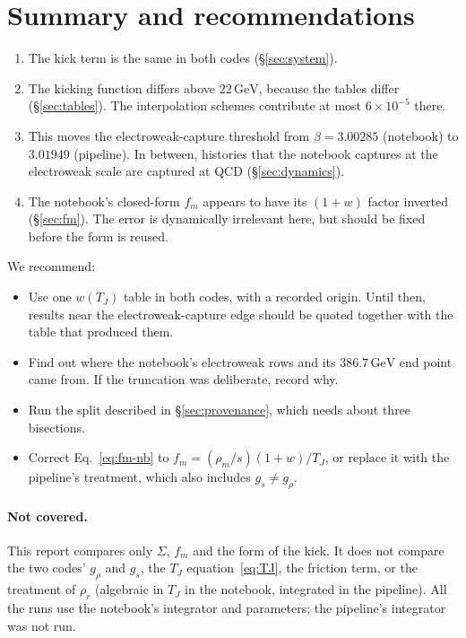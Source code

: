 \documentclass[11pt,a4paper]{article}
\newcommand{\TJ}{T_{J}}
\newcommand{\GeV}{\,\mathrm{GeV}}
\begin{document}
\section{Summary and recommendations}

\begin{enumerate}
\item The kick term is the same in both codes (\S\ref{sec:system}).
\item The kicking function differs above $22\GeV$, because the tables differ (\S\ref{sec:tables}).
  The interpolation schemes contribute at most $6\times10^{-5}$ there.
\item This moves the electroweak-capture threshold from $\beta = 3.00285$ (notebook) to
  $3.01949$ (pipeline). In between, histories that the notebook captures at the electroweak
  scale are captured at QCD (\S\ref{sec:dynamics}).
\item The notebook's closed-form $f_m$ appears to have its $(1+w)$ factor inverted
  (\S\ref{sec:fm}). The error is dynamically irrelevant here, but should be fixed before the
  form is reused.
\end{enumerate}

\noindent We recommend:
\begin{itemize}
\item Use one $w(\TJ)$ table in both codes, with a recorded origin. Until then, results near
  the electroweak-capture edge should be quoted together with the table that produced them.
\item Find out where the notebook's electroweak rows and its $386.7\GeV$ end point came from.
  If the truncation was deliberate, record why.
\item Run the split described in \S\ref{sec:provenance}, which needs about three bisections.
\item Correct Eq.~\eqref{eq:fm-nb} to $f_m = (\rho_m/s)(1+w)/\TJ$, or replace it with the
  pipeline's treatment, which also includes $g_s \neq g_\rho$.
\end{itemize}

\paragraph{Not covered.}
This report compares only $\Sigma$, $f_m$ and the form of the kick. It does not compare the two
codes' $g_\rho$ and $g_s$, the $\TJ$ equation~\eqref{eq:TJ}, the friction term, or the
treatment of $\rho_r$ (algebraic in $\TJ$ in the notebook, integrated in the pipeline). All
the runs use the notebook's integrator and parameters; the pipeline's integrator was not run.
\end{document}
